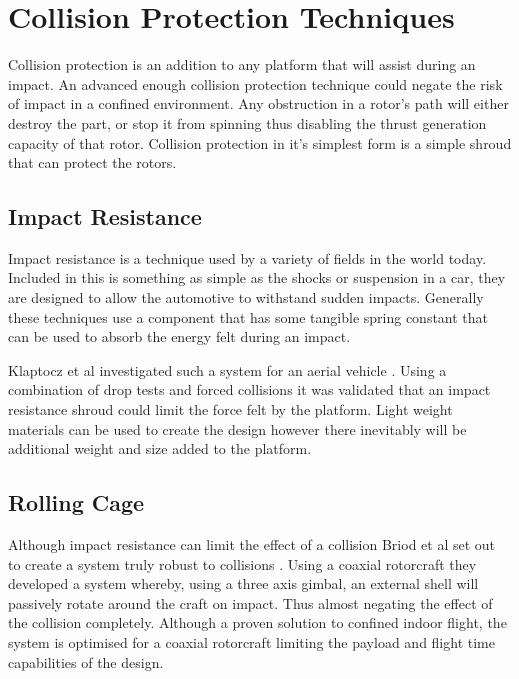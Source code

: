 \section{Collision Protection Techniques}
Collision protection is an addition to any platform that will assist during an impact. An advanced enough collision protection technique could negate the risk of impact in a confined environment. Any obstruction in a rotor's path will either destroy the part, or stop it from spinning thus disabling the thrust generation capacity of that rotor. Collision protection in it's simplest form is a simple shroud that can protect the rotors. 

	\subsection{Impact Resistance}
	Impact resistance is a technique used by a variety of fields in the world today. Included in this is something as simple as the shocks or suspension in a car, they are designed to allow the automotive to withstand sudden impacts. Generally these techniques use a component that has some tangible spring constant that can be used to absorb the energy felt during an impact.
	
	Klaptocz et al investigated such a system for an aerial vehicle \cite{Klaptocz2013}. Using a combination of drop tests and forced collisions it was validated that an impact resistance shroud could limit the force felt by the platform. Light weight materials can be used to create the design however there inevitably will be additional weight and size added to the platform.
	
	\subsection{Rolling Cage}
	Although impact resistance can limit the effect of a collision Briod et al set out to create a system truly robust to collisions \cite{Collision, Briod2012, Klaptocz2010}. Using a coaxial rotorcraft they developed a system whereby, using a three axis gimbal, an external shell will passively rotate around the craft on impact. Thus almost negating the effect of the collision completely. Although a proven solution to confined indoor flight, the system is optimised for a coaxial rotorcraft limiting the payload and flight time capabilities of the design.  
	
	
